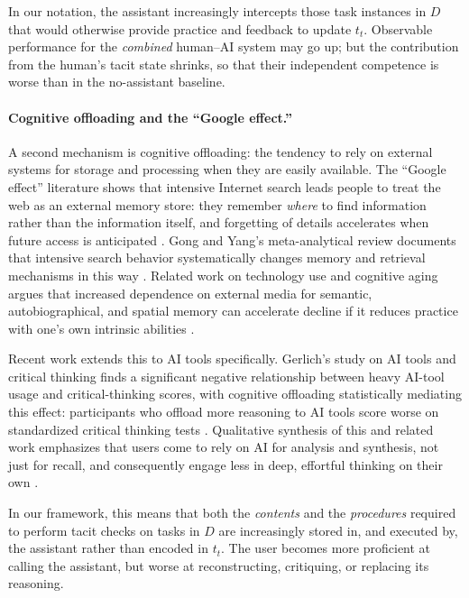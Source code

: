 In our notation, the assistant increasingly intercepts those task instances in $D$ that
would otherwise provide practice and feedback to update $t_t$. Observable performance
for the \emph{combined} human--AI system may go up; but the contribution from the human's
tacit state shrinks, so that their independent competence is worse than in the no-assistant
baseline.

\paragraph{Cognitive offloading and the ``Google effect.''}
A second mechanism is cognitive offloading: the tendency to rely on external systems for
storage and processing when they are easily available. The ``Google effect'' literature
shows that intensive Internet search leads people to treat the web as an external memory
store: they remember \emph{where} to find information rather than the information itself,
and forgetting of details accelerates when future access is anticipated
\citep{gong_yang_google_effect_2024}. Gong and Yang's meta-analytical review documents
that intensive search behavior systematically changes memory and retrieval mechanisms in
this way \citep{gong_yang_google_effect_2024}. Related work on technology use and
cognitive aging argues that increased dependence on external media for semantic,
autobiographical, and spatial memory can accelerate decline if it reduces practice with
one's own intrinsic abilities \citep{benge_tech_use_cognitive_aging_2025}.

Recent work extends this to AI tools specifically. Gerlich's study on AI tools and critical
thinking finds a significant negative relationship between heavy AI-tool usage and
critical-thinking scores, with cognitive offloading statistically mediating this effect:
participants who offload more reasoning to AI tools score worse on standardized critical
thinking tests \citep{gerlich_ai_tools_cognitive_offloading_2025}. Qualitative synthesis
of this and related work emphasizes that users come to rely on AI for analysis and
synthesis, not just for recall, and consequently engage less in deep, effortful thinking on
their own \citep{gerlich_ai_cognitive_implications_2025}.

In our framework, this means that both the \emph{contents} and the \emph{procedures}
required to perform tacit checks on tasks in $D$ are increasingly stored in, and executed
by, the assistant rather than encoded in $t_t$. The user becomes more proficient at calling
the assistant, but worse at reconstructing, critiquing, or replacing its reasoning.

